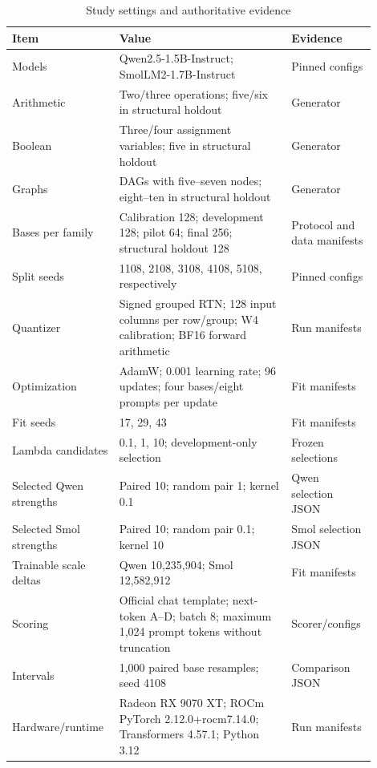 \documentclass[11pt]{article}
\begin{document}
\begin{table}[h]
\centering\small
\caption{Study settings and authoritative evidence}
\label{tab:settings}
\begin{tabular}{p{0.24\linewidth}p{0.45\linewidth}p{0.21\linewidth}}
\toprule
Item & Value & Evidence \\
\midrule
Models & Qwen2.5-1.5B-Instruct; SmolLM2-1.7B-Instruct
 & Pinned configs \\
Arithmetic & Two/three operations; five/six in structural holdout
 & Generator \\
Boolean & Three/four assignment variables; five in structural holdout
 & Generator \\
Graphs & DAGs with five--seven nodes; eight--ten in structural holdout
 & Generator \\
Bases per family & Calibration 128; development 128; pilot 64;
final 256; structural holdout 128 & Protocol and data manifests \\
Split seeds & 1108, 2108, 3108, 4108, 5108, respectively
 & Pinned configs \\
Quantizer & Signed grouped RTN; 128 input columns per row/group;
W4 calibration; BF16 forward arithmetic & Run manifests \\
Optimization & AdamW; 0.001 learning rate; 96 updates;
four bases/eight prompts per update & Fit manifests \\
Fit seeds & 17, 29, 43 & Fit manifests \\
Lambda candidates & 0.1, 1, 10; development-only selection
 & Frozen selections \\
Selected Qwen strengths & Paired 10; random pair 1; kernel 0.1
 & Qwen selection JSON \\
Selected Smol strengths & Paired 10; random pair 0.1; kernel 10
 & Smol selection JSON \\
Trainable scale deltas & Qwen 10,235,904; Smol 12,582,912
 & Fit manifests \\
Scoring & Official chat template; next-token A--D; batch 8;
maximum 1,024 prompt tokens without truncation & Scorer/configs \\
Intervals & 1,000 paired base resamples; seed 4108
 & Comparison JSON \\
Hardware/runtime & Radeon RX 9070 XT; ROCm PyTorch
2.12.0+rocm7.14.0; Transformers 4.57.1; Python 3.12
 & Run manifests \\
\bottomrule
\end{tabular}
\end{table}
\end{document}
